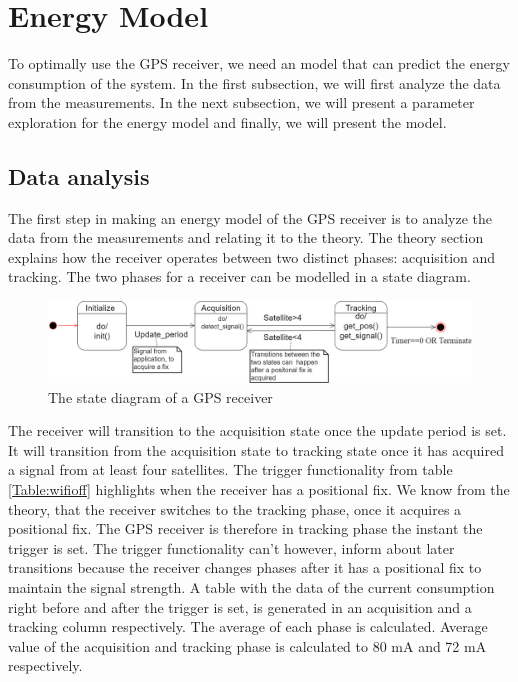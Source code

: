  \chapter{Energy Model}
 To optimally use the GPS receiver, we need an model that can predict the energy consumption of the system. In the first subsection, we will first analyze the data from the measurements. In the next subsection, we will present a parameter exploration for the energy model and finally, we will present the model. 
 \section{Data analysis}
 The first step in making an energy model of the GPS receiver is to analyze the data from the measurements and relating it to the theory. The theory section explains how the receiver operates between two distinct phases: acquisition and tracking. The two phases for a receiver can be modelled in a state diagram. 
 
 
\begin{figure}[H]
\centering
\includegraphics[width=16 cm]{Project_Report/Images/Basic_state_GPS.png}
\caption{The state diagram of a GPS receiver}
\label{fig:GPS reciever}
\end{figure}
The receiver will transition to the acquisition state once the update period is set. It will transition from the acquisition state to tracking state once it has acquired a signal from at least four satellites. 
The trigger functionality from table \ref{Table:wifioff} highlights when the receiver has a positional fix. We know from the theory, that the receiver switches to the tracking phase, once it acquires a positional fix. The GPS receiver is therefore in tracking phase the instant the trigger is set. The trigger functionality can't however, inform about later transitions because the receiver changes phases after it has a positional fix to maintain the signal strength. A table with the data of the current consumption right before and after the trigger is set, is generated in an acquisition and a tracking column respectively. The average of each phase is calculated.  Average value of the acquisition and tracking phase is calculated to 80 mA and 72 mA respectively.

